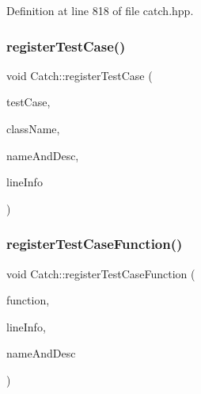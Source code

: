 Definition at line 818 of file catch.\+hpp.

\hypertarget{namespace_catch_a9a59d681cc327a33c280796561dfe258}{}\label{namespace_catch_a9a59d681cc327a33c280796561dfe258} 
\subsubsection{\texorpdfstring{register\+Test\+Case()}{registerTestCase()}}
{\footnotesize\ttfamily void Catch\+::register\+Test\+Case (\begin{DoxyParamCaption}\item[{\hyperlink{struct_catch_1_1_i_test_case}{I\+Test\+Case} $\ast$}]{test\+Case,  }\item[{char const $\ast$}]{class\+Name,  }\item[{\hyperlink{struct_catch_1_1_name_and_desc}{Name\+And\+Desc} const \&}]{name\+And\+Desc,  }\item[{\hyperlink{struct_catch_1_1_source_line_info}{Source\+Line\+Info} const \&}]{line\+Info }\end{DoxyParamCaption})}

\hypertarget{namespace_catch_a220159aeff47f9c5231e893f2abbc643}{}\label{namespace_catch_a220159aeff47f9c5231e893f2abbc643} 
\subsubsection{\texorpdfstring{register\+Test\+Case\+Function()}{registerTestCaseFunction()}}
{\footnotesize\ttfamily void Catch\+::register\+Test\+Case\+Function (\begin{DoxyParamCaption}\item[{\hyperlink{namespace_catch_a26414f52d0835939fae52aadd27e6257}{Test\+Function}}]{function,  }\item[{\hyperlink{struct_catch_1_1_source_line_info}{Source\+Line\+Info} const \&}]{line\+Info,  }\item[{\hyperlink{struct_catch_1_1_name_and_desc}{Name\+And\+Desc} const \&}]{name\+And\+Desc }\end{DoxyParamCaption})}

\hypertarget{namespace_catch_afe4e6770da547e43e9e4eeaa05f946ea}{}\label{namespace_catch_afe4e6770da547e43e9e4eeaa05f946ea} 
